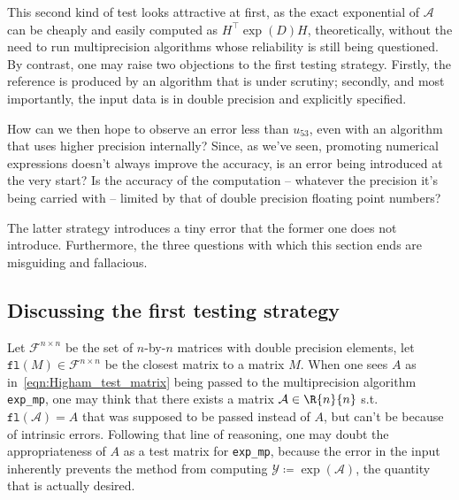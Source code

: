 \noindent This second kind of test looks attractive at first, as the exact exponential of $\mathcal{A}$ can be cheaply and easily computed as $H^{\top}\!\exp(D)H$, theoretically, without the need to run multiprecision algorithms whose reliability is still being questioned. 
By contrast, one may raise two objections to the first testing strategy. Firstly, the reference is produced by an algorithm that is under scrutiny; secondly, and most importantly, the input data is in double precision and explicitly specified.

How can we then hope to observe an error less than $u_{53}$, even with an algorithm that uses higher precision internally? Since, as we've seen, promoting numerical expressions doesn't always improve the accuracy, is an error being introduced at the very start?
Is the accuracy of the computation -- whatever the precision it's being carried with -- limited by that of double precision floating point numbers? 
\smallskip

The latter strategy introduces a tiny error that the former one does not introduce. Furthermore, the three questions with which this section ends are misguiding and fallacious.  

\subsection{Discussing the first testing strategy}\label{subs:1st_strat_argument}
Let $\mathcal{F}^{n\times n}$ be the set of $n$-by-$n$ matrices with double precision elements, let $\mathtt{fl}(M)\in\mathcal{F}^{n\times n}$ be the closest matrix to a matrix $M$.
When one sees $A$ as in~\eqref{eqn:Higham_test_matrix} being passed to the multiprecision algorithm \texttt{exp\_mp}, one may think that there exists a matrix $\mathcal{A}\in\R{n}{n}$ s.t. $\mathtt{fl}(\mathcal{A})=A$ that was supposed to be passed instead of $A$, but can't be because of intrinsic errors. 
Following that line of reasoning, one may doubt the appropriateness of $A$ as a test matrix for \texttt{exp\_mp}, because the error in the input inherently prevents the method from computing $\mathcal{Y}\coloneqq\exp(\mathcal{A})$, the quantity that is actually desired.

